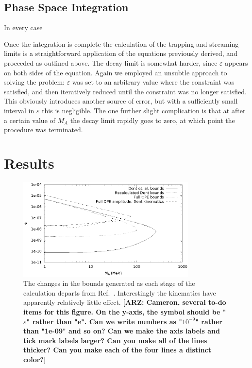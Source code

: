 \documentclass[nofootinbib,prd,superscriptaddress,twocolumn]{revtex4}
\newcommand{\arz}[1]{{{\bf{\color{BrickRed}[ARZ: #1]}}}}
\begin{document}
	
	
\subsection{Phase Space Integration}

In every case 	

Once the integration is complete the calculation of the trapping and streaming limits is a straightforward application of the equations previously derived, and proceeded as outlined above. The decay limit is somewhat harder, since $ \varepsilon $ appears on both sides of the equation. Again we employed an unsubtle approach to solving the problem: $ \varepsilon $ was set to an arbitrary value where the constraint was satisfied, and then iteratively reduced until the constraint was no longer satisfied. This obviously introduces another source of error, but with a sufficiently small interval in $ \varepsilon $ this is negligible. The one further slight complication is that at after a certain value of $ M_A $ the decay limit rapidly goes to zero, at which point the procedure was terminated.
	



\section{Results}
\label{section:results}

\begin{figure}[th]
\includegraphics[width=9cm]{stages.eps}
\caption{The changes in the bounds generated as each stage of the calculation departs from Ref.~\cite{dent_etal12}. Interestingly the kinematics have apparently relatively little effect.
\arz{Cameron, several to-do items for this figure. On the y-axis, the symbol should be "$\varepsilon$" rather than 
"e". Can we write numbers as "$10^{-9}$" rather than "1e-09" and so on? Can we make the axis labels and 
tick mark labels larger? Can you make all of the lines thicker? Can you make each of the four lines a distinct color?}
}
\end{figure}
\end{document}

